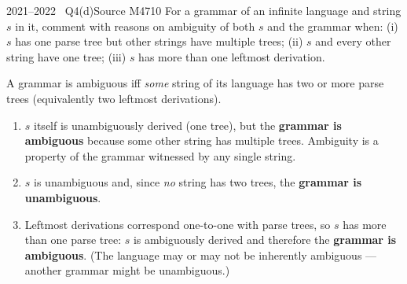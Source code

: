 \documentclass[11pt,a4paper]{article}
\begin{document}
\begin{question}{2021--2022 \textbullet\ Q4(d)}{Source M47}{10}
For a grammar of an infinite language and string $s$ in it, comment with reasons on ambiguity of both $s$ and the grammar when: (i) $s$ has one parse tree but other strings have multiple trees; (ii) $s$ and every other string have one tree; (iii) $s$ has more than one leftmost derivation.
\end{question}
\begin{solution}
A grammar is ambiguous iff \emph{some} string of its language has two or more parse trees (equivalently two leftmost derivations).
\begin{enumerate}
\item $s$ itself is unambiguously derived (one tree), but the \textbf{grammar is ambiguous} because some other string has multiple trees. Ambiguity is a property of the grammar witnessed by any single string.
\item $s$ is unambiguous and, since \emph{no} string has two trees, the \textbf{grammar is unambiguous}.
\item Leftmost derivations correspond one-to-one with parse trees, so $s$ has more than one parse tree: $s$ is ambiguously derived and therefore the \textbf{grammar is ambiguous}. (The language may or may not be inherently ambiguous --- another grammar might be unambiguous.)
\end{enumerate}
\end{solution}
\end{document}
